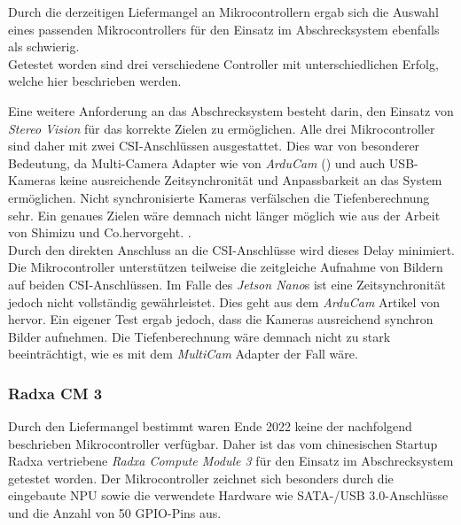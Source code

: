 Durch die derzeitigen Liefermangel an Mikrocontrollern ergab sich die Auswahl eines passenden Mikrocontrollers für den Einsatz im Abschrecksystem ebenfalls als schwierig.\\
Getestet worden sind drei verschiedene Controller mit unterschiedlichen Erfolg, welche hier beschrieben werden.

Eine weitere Anforderung an das Abschrecksystem besteht darin, den Einsatz von \textit{Stereo Vision} für das korrekte Zielen zu ermöglichen. Alle drei Mikrocontroller sind daher mit zwei \ac{CSI}-Anschlüssen ausgestattet. Dies war von besonderer Bedeutung, da Multi-Camera Adapter wie von \textit{ArduCam} (\cite{arducam_multicam}) und auch USB-Kameras keine ausreichende Zeitsynchronität und Anpassbarkeit an das System ermöglichen. Nicht synchronisierte Kameras verfälschen die Tiefenberechnung sehr. Ein genaues Zielen wäre demnach nicht länger möglich wie aus der Arbeit von Shimizu und Co.hervorgeht. \cite{time_delay_sv}.
\\
Durch den direkten Anschluss an die \ac{CSI}-Anschlüsse wird dieses Delay minimiert. Die Mikrocontroller unterstützen teilweise die zeitgleiche Aufnahme von Bildern auf beiden \ac{CSI}-Anschlüssen. Im Falle des \textit{Jetson Nano}s ist eine Zeitsynchronität jedoch nicht vollständig gewährleistet. Dies geht aus dem \textit{ArduCam} Artikel von \cite{arduCam_sync_b01} hervor. Ein eigener Test ergab jedoch, dass die Kameras ausreichend synchron Bilder aufnehmen. Die Tiefenberechnung wäre demnach nicht zu stark beeinträchtigt, wie es mit dem \textit{MultiCam} Adapter der Fall wäre.

\subsubsection{Radxa \ac{CM} 3}

Durch den Liefermangel bestimmt waren Ende 2022 keine der nachfolgend beschrieben Mikrocontroller verfügbar. Daher ist das vom chinesischen Startup Radxa vertriebene \textit{Radxa Compute Module 3} für den Einsatz im Abschrecksystem getestet worden. Der Mikrocontroller zeichnet sich besonders durch die eingebaute \ac{NPU} sowie die verwendete Hardware wie \ac{SATA}-/USB 3.0-Anschlüsse und die Anzahl von 50 \ac{GPIO}-Pins aus. \cite{radxa}

